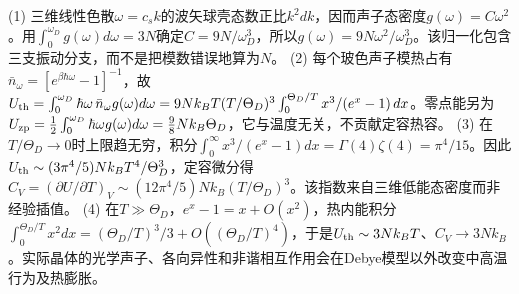 (1) 三维线性色散\(\omega=c_sk\)的波矢球壳态数正比\(k^2dk\)，因而声子态密度\(g(\omega)=C\omega^2\)。用\(\int_0^{\omega_D}g(\omega)d\omega=3N\)确定\(C=9N/\omega_D^3\)，所以\(g(\omega)=9N\omega^2/\omega_D^3\)。该归一化包含三支振动分支，而不是把模数错误地算为\(N\)。
(2) 每个玻色声子模热占有\(\bar n_\omega=[e^{\beta\hbar\omega}-1]^{-1}\)，故\(U_{\rm th}=\int_0^{\omega_D}\hbar\omega\,\bar n_\omega g(\omega)d\omega=9Nk_BT(T/\Theta_D)^3\int_0^{\Theta_D/T}x^3/(e^x-1)\,dx\)。零点能另为\(U_{\rm zp}=\frac12\int_0^{\omega_D}\hbar\omega g(\omega)d\omega=\frac98Nk_B\Theta_D\)，它与温度无关，不贡献定容热容。
(3) 在\(T/\Theta_D\to0\)时上限趋无穷，积分\(\int_0^\infty x^3/(e^x-1)dx=\Gamma(4)\zeta(4)=\pi^4/15\)。因此\(U_{\rm th}\sim(3\pi^4/5)Nk_B T^4/\Theta_D^3\)，定容微分得\(C_V=(\partial U/\partial T)_V\sim(12\pi^4/5)Nk_B(T/\Theta_D)^3\)。该指数来自三维低能态密度而非经验插值。
(4) 在\(T\gg\Theta_D\)，\(e^x-1=x+O(x^2)\)，热内能积分\(\int_0^{\Theta_D/T}x^2dx=(\Theta_D/T)^3/3+O((\Theta_D/T)^4)\)，于是\(U_{\rm th}\sim3Nk_BT\)、\(C_V\to3Nk_B\)。实际晶体的光学声子、各向异性和非谐相互作用会在Debye模型以外改变中高温行为及热膨胀。
